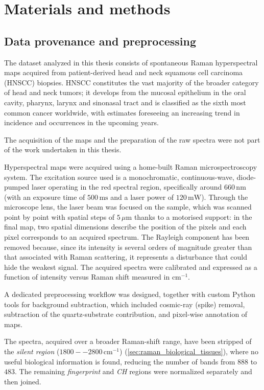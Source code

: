 \chapter{Materials and methods}
\label{ch:materials_methods}

\section{Data provenance and preprocessing}
\label{sec:data_provenance}

The dataset analyzed in this thesis consists of spontaneous Raman hyperspectral maps acquired from patient-derived head and neck squamous cell carcinoma (HNSCC) biopsies. 
HNSCC constitutes the vast majority of the
broader category of head and neck tumors; it develops from the mucosal epithelium in
the oral cavity, pharynx, larynx and sinonasal tract and is classified as the sixth most
common cancer worldwide, with estimates foreseeing an increasing trend in incidence and
occurrences in the upcoming years.

The acquisition of the maps and the preparation of the raw spectra were not part of the work undertaken in this thesis.

Hyperspectral maps were acquired using a home-built Raman microspectroscopy system. The excitation source used is a monochromatic, continuous-wave, diode-pumped laser operating in the red spectral region, specifically around \(660\,\mathrm{nm}\) (with an exposure time of \(500\,\mathrm{ms}\) and a laser power of \(120\,\mathrm{mW}\)).
Through the microscope lens, the laser beam was focused on the sample, which was scanned point by point with spatial steps of \(5\,\mu\mathrm{m}\) thanks to a motorised support: in the final map, two spatial dimensions describe the position of the pixels and each pixel corresponds to an acquired spectrum.
The Rayleigh component has been removed because, since its intensity is several orders of magnitude greater than that associated with Raman scattering, it represents a disturbance that could hide the weakest signal. The acquired spectra were calibrated and expressed as a function of intensity versus Raman shift measured in \(\mathrm{cm}^{-1}\).

A dedicated preprocessing workflow was designed, together with custom Python
tools for background subtraction, which included cosmic-ray (spike) removal, subtraction of the quartz-substrate contribution, and pixel-wise annotation of maps. 

The spectra, acquired over a broader Raman-shift range, have been stripped of the \textit{silent region} (\(1800--2800\,\mathrm{cm}^{-1}\)) (\cref{sec:raman_biological_tissues}), where no useful biological information is found, reducing the number of bands from \(888\) to \(483\). The remaining \textit{fingerprint} and \textit{CH} regions were normalized separately and then joined.

